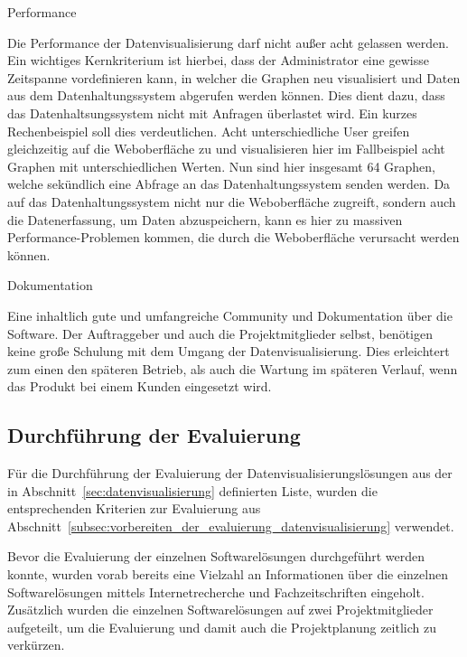 {Performance
\begin{outline}
  \1 Die Performance der Datenvisualisierung darf nicht außer acht gelassen
  werden. Ein wichtiges Kernkriterium ist hierbei, dass der Administrator eine
  gewisse Zeitspanne vordefinieren kann, in welcher die Graphen neu
  visualisiert und Daten aus dem Datenhaltungssystem abgerufen werden können.
  Dies dient dazu, dass das Datenhaltsungssystem nicht mit Anfragen überlastet
  wird. Ein kurzes Rechenbeispiel soll dies verdeutlichen. Acht
  unterschiedliche User greifen gleichzeitig auf die Weboberfläche zu und
  visualisieren hier im Fallbeispiel acht Graphen mit unterschiedlichen Werten.
  Nun sind hier insgesamt 64 Graphen, welche sekündlich eine Abfrage an das
  Datenhaltungssystem senden werden. Da auf das Datenhaltungssystem nicht nur
  die Weboberfläche zugreift, sondern auch die Datenerfassung, um Daten
  abzuspeichern, kann es hier zu massiven Performance-Problemen kommen, die
  durch die Weboberfläche verursacht werden können.
\end{outline}

Dokumentation
\begin{outline}
  \1 Eine inhaltlich gute und umfangreiche Community und Dokumentation über die
  Software. Der Auftraggeber und auch die Projektmitglieder selbst, benötigen
  keine große Schulung mit dem Umgang der Datenvisualisierung. Dies erleichtert
  zum einen den späteren Betrieb, als auch die Wartung im späteren Verlauf,
  wenn das Produkt bei einem Kunden eingesetzt wird.
\end{outline}
\mr%

\subsection{Durchführung der Evaluierung}
\label{subsec:durchfuehrung_evaluierung_datenvisualisierung}
Für die Durchführung der Evaluierung der Datenvisualisierungslösungen aus der
in Abschnitt~\ref{sec:datenvisualisierung} definierten Liste, wurden die
entsprechenden Kriterien zur Evaluierung aus
Abschnitt~\ref{subsec:vorbereiten_der_evaluierung_datenvisualisierung}
verwendet.

Bevor die Evaluierung der einzelnen Softwarelösungen durchgeführt werden
konnte, wurden vorab bereits eine Vielzahl an Informationen über die einzelnen
Softwarelösungen mittels Internetrecherche und Fachzeitschriften eingeholt.
Zusätzlich wurden die einzelnen Softwarelösungen auf zwei Projektmitglieder
aufgeteilt, um die Evaluierung und damit auch die Projektplanung zeitlich zu
verkürzen.

}
